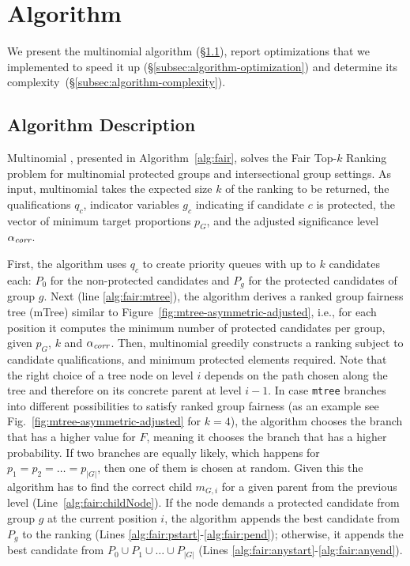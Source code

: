 
\section{Algorithm}\label{sec:algorithms}
We present the multinomial \algoFAIR algorithm (\S\ref{subsec:algorithm-description}), report optimizations that we implemented to speed it up (\S\ref{subsec:algorithm-optimization}) and determine its complexity~(\S\ref{subsec:algorithm-complexity}).

\subsection{Algorithm Description}\label{subsec:algorithm-description}
Multinomial \algoFAIR, presented in Algorithm~\ref{alg:fair}, solves the {\sc Fair Top-$k$ Ranking} problem for multinomial protected groups and intersectional group settings.
%
As input, multinomial \algoFAIR takes
the expected size $k$ of the ranking to be returned,
the qualifications $q_c$,
indicator variables $g_c$ indicating if candidate $c$ is protected,
the vector of minimum target proportions $p_G$, and
the adjusted significance level $\alpha_\textit{corr}$.

First, the algorithm uses $q_c$ to create priority queues with up to $k$ candidates each: $P_0$ for the non-protected candidates and $P_g$ for the protected candidates of group $g$.
%
Next (line \ref{alg:fair:mtree}), the algorithm derives a ranked group fairness tree (mTree) similar to Figure~\ref{fig:mtree-asymmetric-adjusted}, i.e., for each position it computes the minimum number of protected candidates per group, given $p_G$, $k$ and $\alpha_\textit{corr}$.
%
Then, multinomial \algoFAIR greedily constructs a ranking subject to candidate qualifications, and minimum protected elements required.
%
Note that the right choice of a tree node on level $i$ depends on the path chosen along the tree and therefore on its concrete parent at level $i-1$.
%
In case \texttt{mtree} branches into different possibilities to satisfy ranked group fairness (as an example see Fig.~\ref{fig:mtree-asymmetric-adjusted} for $k=4$), the algorithm chooses the branch that has a higher value for $F$, meaning it chooses the branch that has a higher probability.
%
If two branches are equally likely, which happens for $p_1 = p_2 = \ldots = p_{|G|}$, then one of them is chosen at random.
%
Given this the algorithm has to find the correct child $m_{G,i}$ for a given parent from the previous level (Line~\ref{alg:fair:childNode}).
%
If the node demands a protected candidate from group $g$ at the current position $i$, the algorithm appends the best candidate from $P_g$ to the ranking (Lines \ref{alg:fair:pstart}-\ref{alg:fair:pend}); otherwise, it appends the best candidate from $P_0 \cup P_1 \cup \ldots \cup P_{|G|}$ (Lines \ref{alg:fair:anystart}-\ref{alg:fair:anyend}).
%


